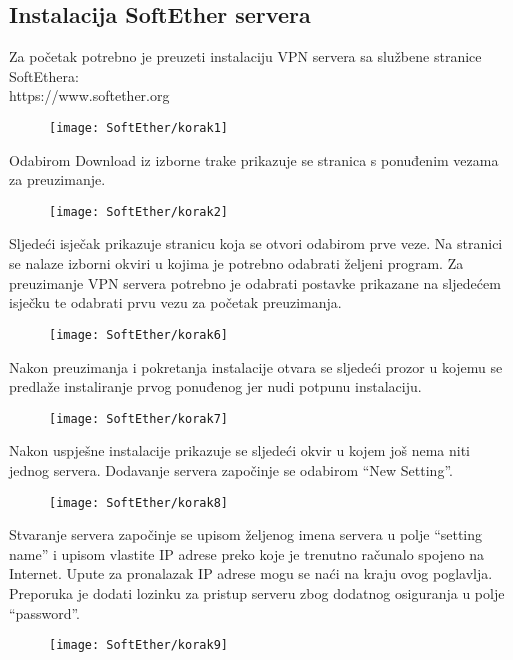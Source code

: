\subsection*{Instalacija SoftEther servera}
\hspace{0.5cm}
Za početak potrebno je preuzeti instalaciju VPN servera sa službene stranice SoftEthera:\\ https://www.softether.org
\begin{figure}[h!]
	\centering
     \texttt{[image: SoftEther/korak1]}
\end{figure}
\FloatBarrier
Odabirom Download iz izborne trake prikazuje se stranica s ponuđenim vezama za preuzimanje.
\begin{figure}[h!]
     \centering
     \texttt{[image: SoftEther/korak2]}
\end{figure}
\FloatBarrier
Sljedeći isječak prikazuje stranicu koja se otvori odabirom prve veze. Na stranici se nalaze izborni okviri u kojima je potrebno odabrati željeni program. Za preuzimanje VPN servera potrebno je odabrati postavke prikazane na sljedećem isječku te odabrati prvu vezu za početak preuzimanja.
\begin{figure}[h!]
     \centering
     \texttt{[image: SoftEther/korak6]}
\end{figure}
\FloatBarrier
Nakon preuzimanja i pokretanja instalacije otvara se sljedeći prozor u kojemu se predlaže instaliranje prvog ponuđenog jer nudi potpunu instalaciju.
\begin{figure}[h!]
     \centering
     \texttt{[image: SoftEther/korak7]}
\end{figure}
\FloatBarrier
Nakon uspješne instalacije prikazuje se sljedeći okvir u kojem još nema niti jednog servera. Dodavanje servera započinje se odabirom ``New Setting''.
\begin{figure}[h!]
     \centering
     \texttt{[image: SoftEther/korak8]}
\end{figure}
\FloatBarrier
Stvaranje servera započinje se upisom željenog imena servera u polje ``setting name'' i upisom vlastite IP adrese preko koje je trenutno računalo spojeno na Internet. Upute za pronalazak IP adrese mogu se naći na kraju ovog poglavlja. Preporuka je dodati lozinku za pristup serveru zbog dodatnog osiguranja u polje ``password''.
\begin{figure}[h!]
     \centering
     \texttt{[image: SoftEther/korak9]}
\end{figure}
